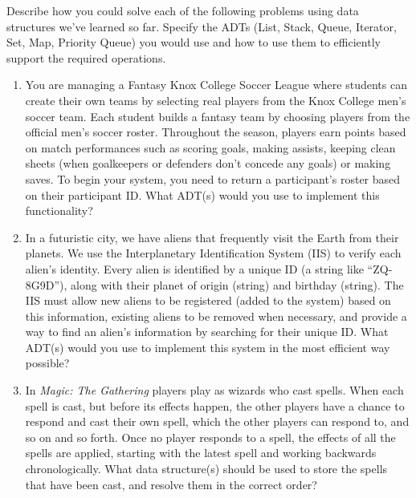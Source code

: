 \documentclass{article}
\begin{document}
Describe how you could solve each of the following problems using data
structures we've learned so far.
Specify the ADTs (List, Stack, Queue, Iterator, Set, Map, Priority Queue) you
would use and how to use them to efficiently support the required
operations.

\begin{enumerate}

\item 
  You are managing a Fantasy Knox College Soccer League where students
  can create their own teams by selecting real players from the Knox
  College men’s soccer team. Each student builds a fantasy team by
  choosing players from the official men's soccer roster. Throughout
  the season, players earn points based on match performances such as
  scoring goals, making assists, keeping clean sheets (when
  goalkeepers or defenders don’t concede any goals) or making saves.
  To begin your system, you need to return a participant's roster based
  on their participant ID.
  What ADT(s) would you use to implement this functionality?

\item 
  In a futuristic city, we have aliens that frequently visit the Earth from their planets. We
use the Interplanetary Identification System (IIS) to verify each alien's identity. Every
alien is identified by a unique ID (a string like ``ZQ-8G9D''), along with their planet of
origin (string) and birthday (string). The IIS must allow new aliens to be registered
(added to the system) based on this information, existing aliens to be removed when
necessary, and provide a way to find an alien’s information by searching for their unique
ID. What ADT(s) would you use to implement this system in the most efficient way
possible?

\item 
  In {\em Magic: The Gathering} players play as wizards who cast
  spells. When each spell is cast, but before its effects happen, the
  other players have a chance to respond and cast their own spell,
  which the other players can respond to, and so on and so forth. Once
  no player responds to a spell, the effects of all the spells are
  applied, starting with the latest spell and working backwards
  chronologically. What data structure(s) should be used to store the
  spells that have been cast, and resolve them in the correct order?
  

\end{enumerate}
\end{document}
